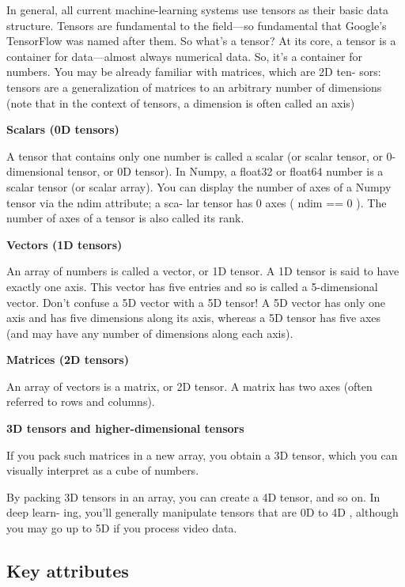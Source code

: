 \documentclass[11pt]{article}
\begin{document}
In general, all current machine-learning systems use tensors as their
basic data structure. Tensors are fundamental to the field---so
fundamental that Google's TensorFlow was named after them. So what's a
tensor? At its core, a tensor is a container for data---almost always
numerical data. So, it's a container for numbers. You may be already
familiar with matrices, which are 2D ten- sors: tensors are a
generalization of matrices to an arbitrary number of dimensions (note
that in the context of tensors, a dimension is often called an axis)

\textbf{Scalars (0D tensors)}

A tensor that contains only one number is called a scalar (or scalar
tensor, or 0-dimensional tensor, or 0D tensor). In Numpy, a float32 or
float64 number is a scalar tensor (or scalar array). You can display the
number of axes of a Numpy tensor via the ndim attribute; a sca- lar
tensor has 0 axes ( ndim == 0 ). The number of axes of a tensor is also
called its rank.

\textbf{Vectors (1D tensors)}

An array of numbers is called a vector, or 1D tensor. A 1D tensor is
said to have exactly one axis. This vector has five entries and so is
called a 5-dimensional vector. Don't confuse a 5D vector with a 5D
tensor! A 5D vector has only one axis and has five dimensions along its
axis, whereas a 5D tensor has five axes (and may have any number of
dimensions along each axis).

\textbf{Matrices (2D tensors)}

An array of vectors is a matrix, or 2D tensor. A matrix has two axes
(often referred to rows and columns).

\textbf{3D tensors and higher-dimensional tensors}

If you pack such matrices in a new array, you obtain a 3D tensor, which
you can visually interpret as a cube of numbers.

By packing 3D tensors in an array, you can create a 4D tensor, and so
on. In deep learn- ing, you'll generally manipulate tensors that are 0D
to 4D , although you may go up to 5D if you process video data.

\hypertarget{key-attributes}{%
\subsection{Key attributes}\label{key-attributes}}
\end{document}
